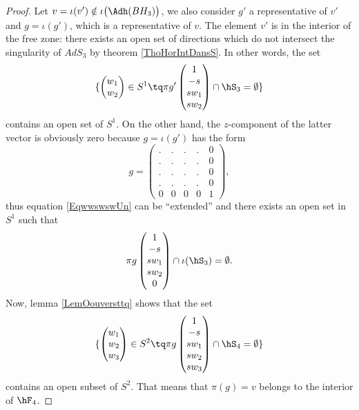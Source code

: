 \begin{proof}

	Let $v=\iota(v')\notin\iota\big( \Adh(BH_3) \big)$, we also consider $g'$ a representative of $v'$ and $g=\iota(g')$, which is a representative of $v$. The element $v'$ is in the interior of the free zone: there exists an open set of directions which do not intersect the singularity of $AdS_3$ by theorem \ref{ThoHorIntDansS}. In other words, the set
\begin{equation}		\label{EqwwswswUn}
	\{ \begin{pmatrix}
	w_1	\\ 
	w_2	
\end{pmatrix}\in S^1\tq
\pi g'\begin{pmatrix}
	1	\\ 
	-s	\\ 
	sw_1	\\ 
	sw_2	
\end{pmatrix}\cap\hS_3 =\emptyset\}
\end{equation}
contains an open set of $S^1$. On the other hand, the $z$-component of the latter vector is obviously zero because $g=\iota(g')$ has the form
\begin{equation}
	g=\begin{pmatrix}
 .	&	.	&	.	&	.	&	0\\ 
 .	&	.	&	.	&	.	&	0\\ 
 .	&	.	&	.	&	.	&	0\\ 
 .	&	.	&	.	&	.	&	0\\ 
0	&	0	&	0	&	0	&	1 
 \end{pmatrix},
\end{equation}
thus equation \eqref{EqwwswswUn} can be ``extended'' and there exists an open set in $S^1$ such that
\begin{equation}
	\pi g\begin{pmatrix}
		1	\\ 
		-s	\\ 
		sw_1	\\ 
		sw_2	\\ 
		0	
	\end{pmatrix}\cap\iota(\hS_3)=\emptyset.
\end{equation}
Now, lemma \ref{LemOouversttq} shows that the set
\begin{equation}
	\{ 
		\begin{pmatrix}
			w_1	\\ 
			w_2	\\ 
			w_3	
		\end{pmatrix}\in S^2\tq
		\pi g\begin{pmatrix}
			1	\\ 
			-s	\\ 
			sw_1	\\ 
			sw_2	\\ 
			sw_3	
		\end{pmatrix}\cap\hS_4=\emptyset
	\}
\end{equation}
contains an open subset of $S^2$. That means that $\pi(g)=v$ belongs to the interior of $\hF_4$.
\end{proof}

